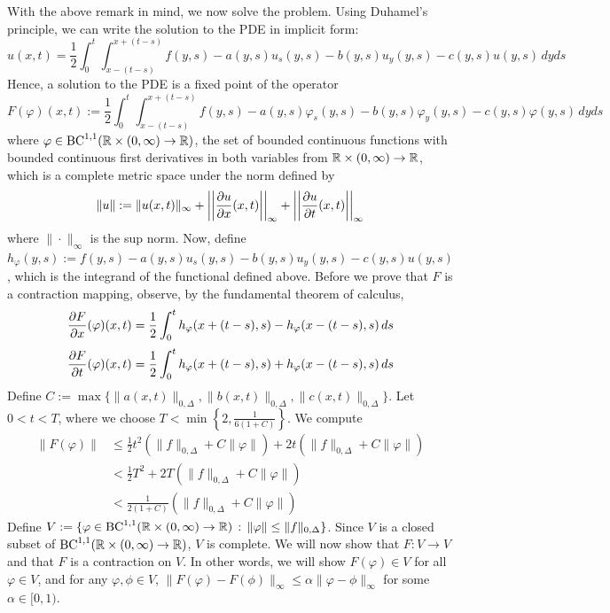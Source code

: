 With the above remark in mind, we now solve the problem. Using Duhamel's principle, we can write the solution to the PDE in implicit form:
$$u(x,t) =  \frac{1}{2} \int_0^t \int_{x-(t-s)}^{x+(t-s)} f(y,s) - a(y,s) u_s(y,s) - b(y,s) u_y (y,s) - c(y,s) u(y,s) \, dy ds $$
Hence, a solution to the PDE is a fixed point of the operator
$$ F(\varphi)(x,t) := \frac{1}{2}  \int_0^t \int_{x-(t-s)}^{x+(t-s)} f(y,s) - a(y,s) \varphi_s(y,s) - b(y,s) \varphi_y (y,s) - c(y,s) \varphi (y,s) \, dy ds $$
where $\varphi \in \text{BC}^{1,1} (\mathbb{R} \times (0,\infty) \to \mathbb{R})$, the set of bounded continuous functions with bounded continuous first derivatives in both variables from $\mathbb{R} \times (0,\infty) \to \mathbb{R}$, which is a complete metric space under the norm defined by
$$ \|u\| :=  \|u(x,t)\|_{\infty} + \left| \left| \frac{\partial u}{\partial x} (x,t) \right| \right|_{\infty} + \left| \left| \frac{\partial u}{\partial t} (x,t) \right| \right|_{\infty} $$
where $\| \cdot \|_{\infty}$ is the sup norm. Now, define $h_{\varphi}(y,s) := f(y,s) - a(y,s) u_s(y,s) - b(y,s) u_y (y,s) - c(y,s) u(y,s)$, which is the integrand of the functional defined above. Before we prove that $F$ is a contraction mapping, observe, by the fundamental theorem of calculus,
$$ \frac{\partial F}{\partial x}(\varphi)(x,t) = \frac{1}{2} \int_0^t h_{\varphi}(x+(t-s),s) - h_{\varphi}(x-(t-s),s) \, ds $$
$$ \frac{\partial F}{\partial t}(\varphi)(x,t) = \frac{1}{2} \int_0^t h_{\varphi} (x+(t-s),s) + h_{\varphi}(x-(t-s),s) \, ds $$
Define  $C := \max \{ \|a(x,t)\|_{0,\Delta}, \|b(x,t)\|_{0,\Delta}, \|c(x,t)\|_{0,\Delta}\}$. Let $0 < t < T$, where we choose $T < \min \left\{ 2, \frac{1}{6(1+C)} \right\}$. We compute
\begin{align}
\nonumber \|F(\varphi)\| &\leq \frac{1}{2}t^2(  \|f\|_{0,\Delta} + C \|\varphi\|) + 2t( \|f\|_{0,\Delta} + C \|\varphi\|)   \\
\nonumber &< \frac{1}{2}T^2 + 2T(\|f\|_{0,\Delta} + C \|\varphi\|) \\
\label{s12bound} &< \frac{1}{2(1+C)} (\|f\|_{0,\Delta} + C \|\varphi\|)
\end{align}
Define $V := \{ \varphi \in \text{BC}^{1,1} (\mathbb{R} \times (0,\infty) \to \mathbb{R}) \, : \, \|\varphi\| \leq \|f\|_{0,\Delta} \}$. Since $V$ is a closed subset of $\text{BC}^{1,1} (\mathbb{R} \times (0,\infty) \to \mathbb{R})$, $V$ is complete. We will now show that $F : V \to V$ and that $F$ is a contraction on $V$. In other words, we will show $F(\varphi) \in V$ for all $\varphi \in V$, and for any $\varphi, \phi \in V$, $\|F(\varphi) - F(\phi)\|_{\infty} \leq \alpha \|\varphi-\phi\|_{\infty}$ for some $\alpha \in [0,1)$.

